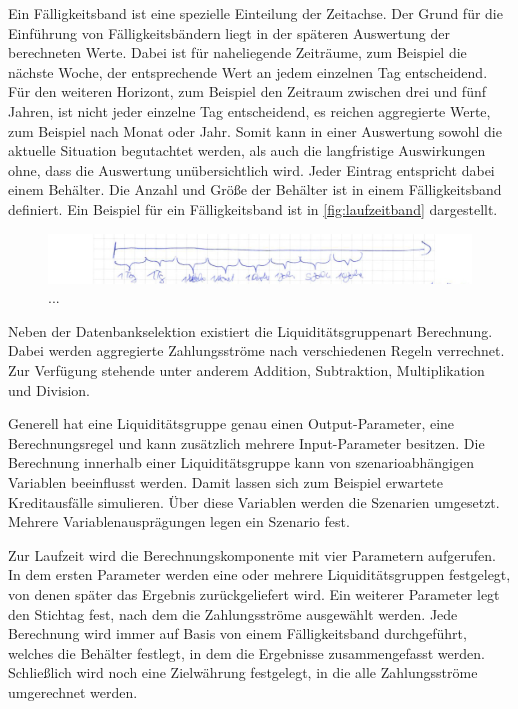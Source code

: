 \begin{onehalfspacing}
Ein Fälligkeitsband ist eine spezielle Einteilung der Zeitachse. Der Grund für die Einführung von Fälligkeitsbändern liegt in der späteren Auswertung der berechneten Werte. Dabei ist für naheliegende Zeiträume, zum Beispiel die nächste Woche, der entsprechende Wert an jedem einzelnen Tag entscheidend. Für den weiteren Horizont, zum Beispiel den Zeitraum zwischen drei und fünf Jahren, ist nicht jeder einzelne Tag  entscheidend, es reichen aggregierte Werte, zum Beispiel nach Monat oder Jahr. Somit kann in einer Auswertung sowohl die aktuelle Situation begutachtet werden, als auch die langfristige Auswirkungen ohne, dass die Auswertung unübersichtlich wird. Jeder Eintrag entspricht dabei einem Behälter. Die Anzahl und Größe der Behälter ist in einem Fälligkeitsband definiert. Ein Beispiel für ein Fälligkeitsband ist in \vref{fig:laufzeitband} dargestellt.

\begin{figure}[h]
\centering
\setlength{\unitlength}{1mm}
\includegraphics[width=15cm]{images/laufzeitband.jpg}
\caption{...\label{fig:laufzeitband}}
\end{figure} 

Neben der Datenbankselektion existiert die Liquiditätsgruppenart Berechnung. Dabei werden aggregierte Zahlungsströme nach verschiedenen Regeln verrechnet. Zur Verfügung stehende unter anderem Addition, Subtraktion, Multiplikation und Division. 

Generell hat eine Liquiditätsgruppe genau einen Output-Parameter, eine Berechnungsregel und kann zusätzlich mehrere Input-Parameter besitzen. Die Berechnung innerhalb einer Liquiditätsgruppe kann von szenarioabhängigen Variablen beeinflusst werden. Damit lassen sich zum Beispiel erwartete Kreditausfälle simulieren. Über diese Variablen werden die Szenarien umgesetzt. Mehrere Variablenausprägungen legen ein Szenario fest.

\label{sec:berechnungskomponente:parameter}
Zur Laufzeit wird die Berechnungskomponente mit vier Parametern aufgerufen. In dem ersten Parameter werden eine oder mehrere Liquiditätsgruppen festgelegt, von denen später das Ergebnis zurückgeliefert wird. Ein weiterer Parameter legt den Stichtag fest, nach dem die Zahlungsströme ausgewählt werden. Jede Berechnung wird immer auf Basis von einem Fälligkeitsband durchgeführt, welches die Behälter festlegt, in dem die Ergebnisse zusammengefasst werden. Schließlich wird noch eine Zielwährung festgelegt, in die alle Zahlungsströme umgerechnet werden.


\end{onehalfspacing}
